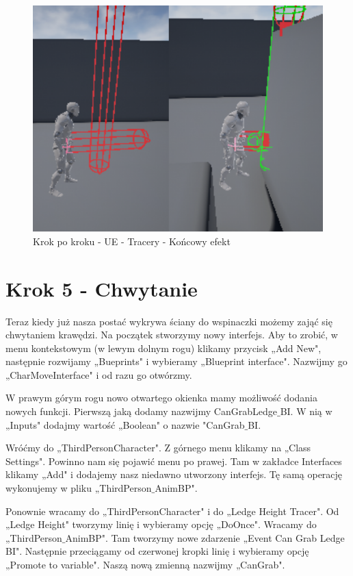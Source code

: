 \documentclass[12pt]{xmgr}
\begin{document}
\begin{figure}[!htb]
    \begin{center}
    \includegraphics[scale=0.5]{Screeny/UeKrokPoKroku/spherecollision}
    \end{center}
    \caption{Krok po kroku - UE - Tracery - Końcowy efekt}
\end{figure}

\section{Krok 5 - Chwytanie}

Teraz kiedy już nasza postać wykrywa ściany do wspinaczki możemy zająć się chwytaniem krawędzi. Na początek stworzymy nowy interfejs. Aby to zrobić, w menu kontekstowym (w lewym dolnym rogu) klikamy przycisk „Add New", następnie rozwijamy „Bueprints" i wybieramy „Blueprint interface". Nazwijmy go „CharMoveInterface" i od razu go otwórzmy.

W prawym górym rogu nowo otwartego okienka mamy możliwość dodania nowych funkcji. Pierwszą jaką dodamy nazwijmy CanGrabLedge$\_$BI. W nią w „Inputs" dodajmy wartość „Boolean" o nazwie "CanGrab$\_$BI.

Wróćmy do „ThirdPersonCharacter". Z górnego menu klikamy na „Class Settings". Powinno nam się pojawić menu po prawej. Tam w zakładce Interfaces klikamy „Add" i dodajemy nasz niedawno utworzony interfejs. Tę samą operację wykonujemy w pliku „ThirdPerson$\_$AnimBP".

Ponownie wracamy do „ThirdPersonCharacter" i do „Ledge Height Tracer". Od „Ledge Height" tworzymy linię i wybieramy opcję „DoOnce". Wracamy do „ThirdPerson$\_$AnimBP". Tam tworzymy nowe zdarzenie „Event Can Grab Ledge BI". Następnie przeciągamy od czerwonej kropki linię i wybieramy opcję „Promote to variable". Naszą nową zmienną nazwijmy „CanGrab".
\end{document}
